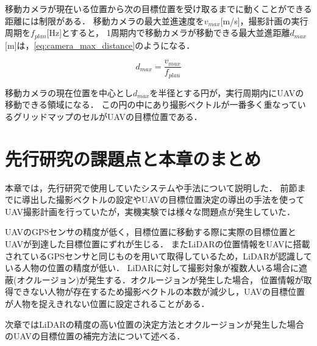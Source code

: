 \documentclass[autodetect-engine,dvipdfmx-if-dvi,ja=standard,a4j,jbase=11pt,magstyle=nomag*]{bxjsreport}
\begin{document}
\newpage
移動カメラが現在いる位置から次の目標位置を受け取るまでに動くことができる距離には制限がある．
移動カメラの最大並進速度を$v_{max}$[m/s]，撮影計画の実行周期を$f_{plan}$[Hz]とすると，
1周期内で移動カメラが移動できる最大並進距離$d_{max}$[m]は，\cref{eq:camera_max_distance}のようになる．

\begin{equation}
d_{max} = \frac{v_{max}}{f_{plan}}
\label{eq:camera_max_distance}
\end{equation}

移動カメラの現在位置を中心とし$d_{max}$を半径とする円が，実行周期内にUAVの移動できる領域になる．
この円の中にあり撮影ベクトルが一番多く重なっているグリッドマップのセルがUAVの目標位置である．

\section{先行研究の課題点と本章のまとめ}
本章では，先行研究で使用していたシステムや手法について説明した．
前節までに導出した撮影ベクトルの設定やUAVの目標位置決定の導出の手法を使ってUAV撮影計画を行っていたが，実機実験では様々な問題点が発生していた．

UAVのGPSセンサの精度が低く，目標位置に移動する際に実際の目標位置とUAVが到達した目標位置にずれが生じる．
またLiDARの位置情報をUAVに搭載されているGPSセンサと同じものを用いて取得しているため，LiDARが認識している人物の位置の精度が低い．
LiDARに対して撮影対象が複数人いる場合に遮蔽(オクルージョン)が発生する．オクルージョンが発生した場合，
位置情報が取得できない人物が存在するため撮影ベクトルの本数が減少し，UAVの目標位置が人物を捉えきれない位置に設定されることがある．

次章ではLiDARの精度の高い位置の決定方法とオクルージョンが発生した場合のUAVの目標位置の補完方法について述べる．
\end{document}
